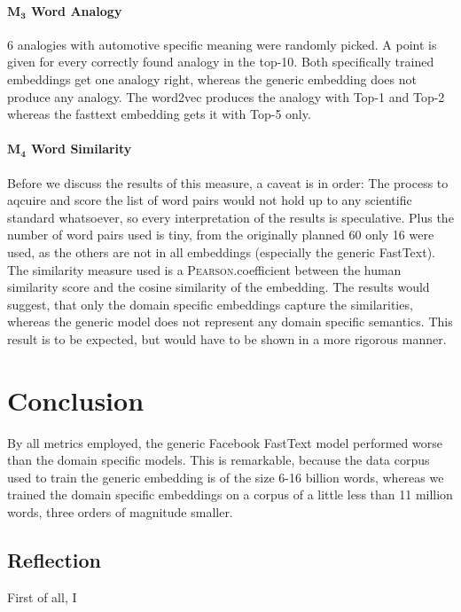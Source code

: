 \documentclass[10pt,a4paper]{article}
\begin{document}
\paragraph{$\boldsymbol{M_3}$ Word Analogy}
6 analogies with automotive specific meaning were randomly picked. A point is given for every correctly found analogy in the top-10. Both specifically trained embeddings get one analogy right, whereas the generic embedding does not produce any analogy. The word2vec produces the analogy with Top-1 and Top-2 whereas the fasttext embedding gets it with Top-5 only.

\paragraph{$\boldsymbol{M_4}$ Word Similarity} Before we discuss the results of this measure, a caveat is in order: The process to aqcuire and score the list of word pairs would not hold up to any scientific standard whatsoever, so every interpretation of the results is speculative. Plus the number of word pairs used is tiny, from the originally planned 60 only 16 were used, as the others are not in all embeddings (especially the generic FastText). 
The similarity measure used is a \textsc{Pearson}.coefficient between the human similarity score and the cosine similarity of the embedding. 
The results would suggest, that only the domain specific embeddings capture the similarities, whereas the generic model does not represent any domain specific semantics. This result is to be expected, but would have to be shown in a more rigorous manner.  




\section{Conclusion}
	
By all metrics employed, the generic Facebook FastText model performed worse than the domain specific models. This is remarkable, because the data corpus used to train the generic embedding	is of the size 6-16 billion words, whereas we trained the domain specific embeddings on a corpus of a little less than 11 million words, three orders of magnitude smaller.
	
	\subsection{Reflection}
	
	First of all, I 
	
\end{document}

